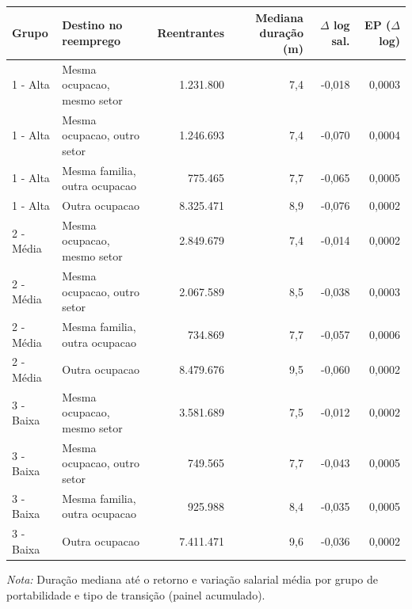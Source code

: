 \providecommand{\toprule}{\hline\hline}
\providecommand{\midrule}{\hline}
\providecommand{\bottomrule}{\hline\hline}
\providecommand{\addlinespace}[1][]{}
{\small
\renewcommand{\arraystretch}{1.12}
\begin{tabular}{llrrrr}
\toprule
Grupo & Destino no reemprego & Reentrantes & Mediana duração (m) & $\Delta$ log sal. & EP ($\Delta$ log) \\
\midrule
1 - Alta & Mesma ocupacao, mesmo setor & 1.231.800 & 7,4 & -0,018 & 0,0003 \\
1 - Alta & Mesma ocupacao, outro setor & 1.246.693 & 7,4 & -0,070 & 0,0004 \\
1 - Alta & Mesma familia, outra ocupacao & 775.465 & 7,7 & -0,065 & 0,0005 \\
1 - Alta & Outra ocupacao & 8.325.471 & 8,9 & -0,076 & 0,0002 \\
\addlinespace[3pt]
2 - Média & Mesma ocupacao, mesmo setor & 2.849.679 & 7,4 & -0,014 & 0,0002 \\
2 - Média & Mesma ocupacao, outro setor & 2.067.589 & 8,5 & -0,038 & 0,0003 \\
2 - Média & Mesma familia, outra ocupacao & 734.869 & 7,7 & -0,057 & 0,0006 \\
2 - Média & Outra ocupacao & 8.479.676 & 9,5 & -0,060 & 0,0002 \\
\addlinespace[3pt]
3 - Baixa & Mesma ocupacao, mesmo setor & 3.581.689 & 7,5 & -0,012 & 0,0002 \\
3 - Baixa & Mesma ocupacao, outro setor & 749.565 & 7,7 & -0,043 & 0,0005 \\
3 - Baixa & Mesma familia, outra ocupacao & 925.988 & 8,4 & -0,035 & 0,0005 \\
3 - Baixa & Outra ocupacao & 7.411.471 & 9,6 & -0,036 & 0,0002 \\
\bottomrule
\end{tabular}
\vspace{2pt}
\par{\footnotesize \textit{Nota:} Duração mediana até o retorno e variação salarial média por grupo de portabilidade e tipo de transição (painel acumulado).}
}
